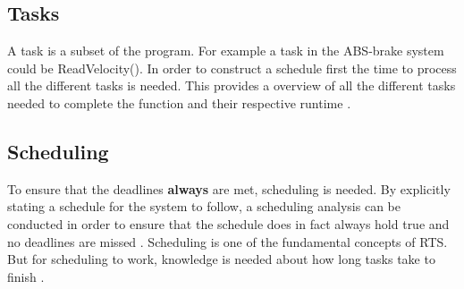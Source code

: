\subsection{Tasks}
A task is a subset of the program. For example a task in the ABS-brake system
could be ReadVelocity(). In order to construct a schedule first the time to
process all the different tasks is needed. This provides a overview of all the
different tasks needed to complete the function and their respective runtime
\Source.

\subsection{Scheduling}
To ensure that the deadlines \textbf{always} are met, scheduling is needed.
By explicitly stating a schedule for the system to follow, a scheduling analysis
can be conducted in order to ensure that the schedule does in fact always hold
true and no deadlines are missed \Source. Scheduling is one of the
fundamental concepts of RTS. But for scheduling to work, knowledge is needed
about how long tasks take to finish \Source. 



